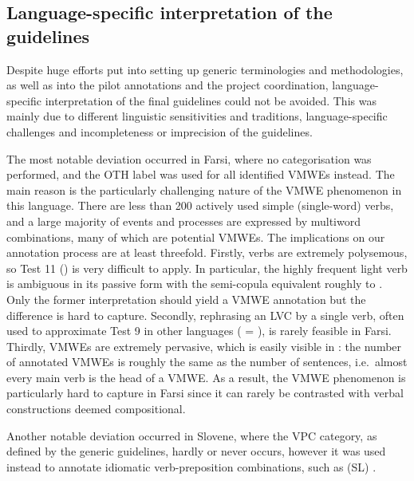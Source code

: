 \documentclass[output=paper,
modfonts,
]{langscibook}
\begin{document}
\subsection{Language-specific interpretation of the guidelines}
\label{sec:lang-spec-guide}
%
Despite huge efforts put into setting up generic terminologies and methodologies, as well as into the pilot annotations and the project coordination, language-specific interpretation of the final guidelines could not be avoided. This was mainly due to different linguistic sensitivities and traditions, language-specific challenges and incompleteness or imprecision of the guidelines.

The most notable deviation occurred in Farsi, where no categorisation was performed, and the OTH label was used for all identified VMWEs instead. The main reason is the particularly challenging nature of the VMWE phenomenon in this language. There are less than 200 actively used simple (single-word) verbs, and a large majority of events and processes are expressed by multiword combinations, many of which are potential VMWEs. 
The implications on our annotation process are at least threefold. Firstly, verbs are extremely polysemous, so Test 11 () is very difficult to apply. In particular, 
the highly frequent light verb 
 is ambiguous in its passive form   with the semi-copula equivalent roughly to . Only the former interpretation should yield a VMWE annotation but the difference is hard to capture.  
Secondly, rephrasing an LVC by a single verb, often used to approximate Test 9 in other languages ( = ), is rarely feasible in Farsi. Thirdly, VMWEs are extremely pervasive, which is easily visible in : the number of annotated VMWEs is roughly the same as the number of sentences, i.e.\ almost every main verb is the head of a VMWE. As a result, the VMWE phenomenon is particularly hard to capture in Farsi since it can rarely be contrasted  with verbal constructions deemed compositional.

Another notable deviation occurred in Slovene, where the VPC category, as defined by the generic guidelines, hardly or never occurs, however it was used instead to annotate idiomatic verb-preposition combinations, such as  (SL) . 
\end{document}
